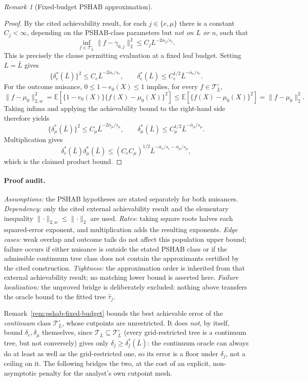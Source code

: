 \documentclass[11pt]{article}
\theoremstyle{plain}
\theoremstyle{definition}
\theoremstyle{remark}
\newtheorem{remark}[theorem]{Remark}
\newcommand{\E}{\mathbb{E}}
\newcommand{\cT}{\mathcal{T}}
\newcommand{\ez}{e_0}
\newcommand{\mz}{\mu_0}
\newcommand{\that}{\widehat{\tau}}
\newcommand{\Ltwo}[1]{\lVert #1 \rVert_{2}}
\newcommand{\Lw}[1]{\lVert #1 \rVert_{2,w}}
\begin{document}
\begin{remark}[Fixed-budget PSHAB approximation]
\begin{proof}
By the cited achievability result, for each $j\in\{e,\mu\}$ there is a
constant $C_j<\infty$, depending on the PSHAB-class parameters but
\emph{not on $L$ or $n$}, such that
\[
  \inf_{f\in\cT_L^\circ}
  \Ltwo{f-\gamma_{0,j}}^2
  \le C_jL^{-2\bar\alpha_j/s_j}.
\]
This is precisely the clause permitting evaluation at a fixed leaf budget.
Setting $L=\bar L$ gives
\[
  \bigl\{\delta_e^*(\bar L)\bigr\}^2
  \le C_e\bar L^{-2\bar\alpha_e/s_e},
  \qquad
  \delta_e^*(\bar L)
  \le C_e^{1/2}\bar L^{-\bar\alpha_e/s_e}.
\]
For the outcome nuisance, $0\le1-\ez(X)\le1$ implies, for every
$f\in\cT_{\bar L}^{\circ}$,
\[
  \Lw{f-\mz}^2
  =\E\!\left[\{1-\ez(X)\}\{f(X)-\mz(X)\}^2\right]
  \le\E\!\left[\{f(X)-\mz(X)\}^2\right]
  =\Ltwo{f-\mz}^2.
\]
Taking infima and applying the achievability bound to the right-hand side
therefore yields
\[
  \bigl\{\delta_\mu^*(\bar L)\bigr\}^2
  \le C_\mu\bar L^{-2\bar\alpha_\mu/s_\mu},
  \qquad
  \delta_\mu^*(\bar L)
  \le C_\mu^{1/2}\bar L^{-\bar\alpha_\mu/s_\mu}.
\]
Multiplication gives
\[
  \delta_e^*(\bar L)\delta_\mu^*(\bar L)
  \le (C_eC_\mu)^{1/2}
     \bar L^{-\bar\alpha_e/s_e-\bar\alpha_\mu/s_\mu},
\]
which is the claimed product bound.
\end{proof}

\paragraph{Proof audit.}
\emph{Assumptions:} the PSHAB hypotheses are stated separately for both
nuisances.  \emph{Dependency:} only the cited external achievability result
and the elementary inequality $\Lw{\cdot}\le\Ltwo{\cdot}$ are used.
\emph{Rates:} taking square roots halves each squared-error exponent, and
multiplication adds the resulting exponents.
\emph{Edge cases:} weak overlap and outcome tails do not affect this
population upper bound; failure occurs if either nuisance is outside the stated
PSHAB class or if the admissible continuum tree class does not contain the
approximants certified by the cited construction.
\emph{Tightness:} the approximation order is inherited from that external
achievability result; no matching lower bound is asserted here.
\emph{Failure localization:} the unproved bridge is deliberately excluded:
nothing above transfers the oracle bound to the fitted tree $\that_j$.
\end{remark}

\noindent Remark~\ref{rem:pshab-fixed-budget} bounds the best achievable
error of the \emph{continuum} class $\cT_{\bar L}^\circ$, whose cutpoints are
unrestricted. It does \emph{not}, by itself, bound $\delta_e,\delta_\mu$
themselves, since $\cT_{\bar L}\subseteq\cT_{\bar L}^\circ$ (every
grid-restricted tree is a continuum tree, but not conversely) gives only
$\delta_j\ge\delta_j^*(\bar L)$: the continuum oracle can always do at least
as well as the grid-restricted one, so its error is a floor under
$\delta_j$, not a ceiling on it. The following bridges the two, at the cost
of an explicit, non-asymptotic penalty for the analyst's own cutpoint mesh.
\end{document}
